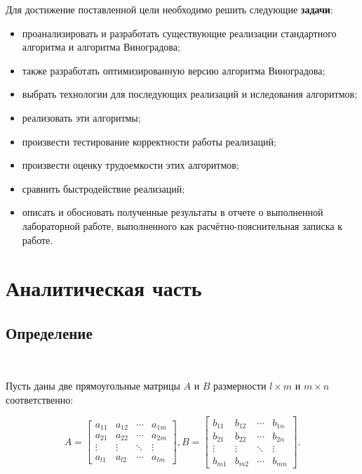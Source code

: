 \documentclass[12pt]{report}
\begin{document}
	Для достижение поставленной цели необходимо решить следующие \textbf{задачи}:
	\begin{itemize}
		\item проанализировать и разработать существующие реализации стандартного алгоритма и алгоритма Виноградова;
		\item также разработать оптимизированную версию алгоритма Виноградова;
		\item выбрать технологии для последующих реализаций и иследования
		алгоритмов;
		\item реализовать эти алгоритмы;
		\item произвести тестирование корректности работы реализаций;
		\item произвести оценку трудоемкости этих алгоритмов;
		\item сравнить быстродействие реализаций;
		\item описать и обосновать полученные результаты в отчете о выполненной лабораторной работе, выполненного как расчётно-пояснительная записка к работе.
	\end{itemize}
	
	
	\chapter{Аналитическая часть}
	
	\section{Определение}
	
	~\
	
	Пусть даны две прямоугольные матрицы ${\displaystyle A}$ и ${\displaystyle B}$ размерности ${\displaystyle l\times m}$ и ${\displaystyle m\times n}$ соответственно:
	
	
	\begin{equation} \label{eq1}
		A={
			\begin{bmatrix}
				a_{11} & a_{12} & \cdots & a_{1m} \\
				a_{21} & a_{22} & \cdots & a_{2m} \\
				\vdots & \vdots & \ddots & \vdots \\
				a_{l1} & a_{l2} & \cdots & a_{lm}
			\end{bmatrix}},
	    B={
	    	\begin{bmatrix}
		    	b_{11} & b_{12} & \cdots & b_{1n} \\
		    	b_{21} & b_{22} & \cdots & b_{2n} \\
		    	\vdots & \vdots & \ddots & \vdots \\
		    	b_{m1} & b_{m2} & \cdots & b_{mn}
	    	\end{bmatrix}
    }.
	\end{equation}
	
\end{document}
